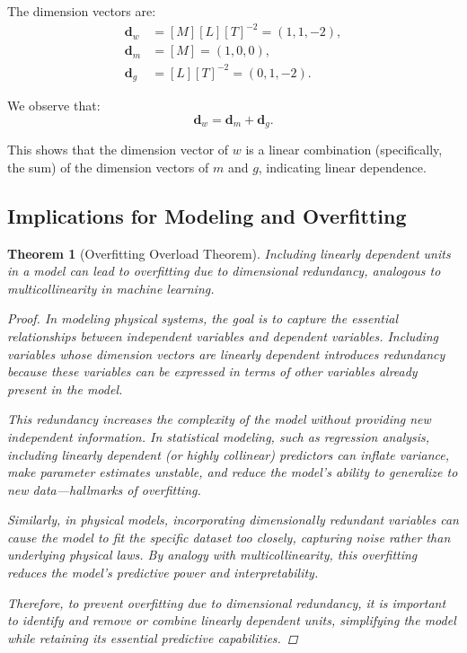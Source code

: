 \documentclass{article}
\newtheorem{theorem}{Theorem}[section]
\theoremstyle{definition}
\theoremstyle{remark}
\begin{document}
	The dimension vectors are:
	\begin{align*}
		\mathbf{d}_w &= [M][L][T]^{-2} = (1,1,-2), \\
		\mathbf{d}_m &= [M] = (1,0,0), \\
		\mathbf{d}_g &= [L][T]^{-2} = (0,1,-2).
	\end{align*}
	
	We observe that:
	\[
	\mathbf{d}_w = \mathbf{d}_m + \mathbf{d}_g.
	\]
	
	This shows that the dimension vector of $w$ is a linear combination (specifically, the sum) of the dimension vectors of $m$ and $g$, indicating linear dependence.
	
	\subsection{Implications for Modeling and Overfitting}
	
	\begin{theorem}[Overfitting Overload Theorem]
		Including linearly dependent units in a model can lead to overfitting due to dimensional redundancy, analogous to multicollinearity in machine learning.
		
		\begin{proof}
			In modeling physical systems, the goal is to capture the essential relationships between independent variables and dependent variables. Including variables whose dimension vectors are linearly dependent introduces redundancy because these variables can be expressed in terms of other variables already present in the model.
			
			This redundancy increases the complexity of the model without providing new independent information. In statistical modeling, such as regression analysis, including linearly dependent (or highly collinear) predictors can inflate variance, make parameter estimates unstable, and reduce the model's ability to generalize to new data—hallmarks of overfitting.
			
			Similarly, in physical models, incorporating dimensionally redundant variables can cause the model to fit the specific dataset too closely, capturing noise rather than underlying physical laws. By analogy with multicollinearity, this overfitting reduces the model's predictive power and interpretability.
			
			Therefore, to prevent overfitting due to dimensional redundancy, it is important to identify and remove or combine linearly dependent units, simplifying the model while retaining its essential predictive capabilities.
		\end{proof}
	\end{theorem}
	
\end{document}
